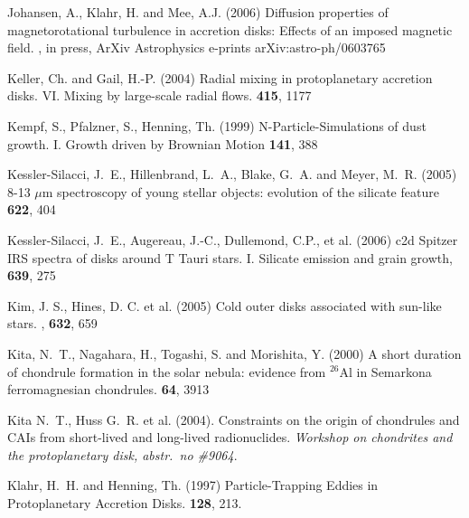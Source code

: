 \begin{literature}
\item Johansen, A., Klahr, H. and Mee, A.J. (2006) 
Diffusion properties of magnetorotational turbulence in accretion disks:
Effects of an imposed magnetic field. \mn, in press, 
ArXiv Astrophysics e-prints arXiv:astro-ph/0603765

\item
Keller, Ch. and Gail, H.-P. (2004) Radial mixing in protoplanetary accretion
disks. VI. Mixing by large-scale radial flows. \aap \textbf{415}, 1177

\item
Kempf, S., Pfalzner, S., Henning, Th. (1999) N-Particle-Simulations of dust
growth. I. Growth driven by Brownian Motion \ica \textbf{141}, 388

\item
Kessler-Silacci, J.~E., Hillenbrand, L.~A., Blake, G.~A. and Meyer, M.~R.
(2005) 8-13 $\mu$m spectroscopy of young stellar objects: evolution of
the silicate feature \apj \textbf{622}, 404

\item 
Kessler-Silacci, J.~E., Augereau, J.-C., Dullemond, C.P., et al. (2006) c2d
Spitzer IRS spectra of disks around T Tauri stars. I. Silicate emission and
grain growth, \apj \textbf{639}, 275

\item
Kim, J. S., Hines, D. C. et al. (2005) Cold outer disks associated with
sun-like stars. \apj, \textbf{632}, 659

\item
Kita, N.~T., Nagahara, H., Togashi, S. and Morishita, Y. (2000)
A short duration of chondrule formation in the solar nebula: evidence from 
$^{26}$Al in Semarkona ferromagnesian chondrules. \gca \textbf{64}, 3913


\item
Kita N.~T., Huss G.~R. et al. (2004). Constraints on the origin of
chondrules and CAIs from short-lived and long-lived
radionuclides.   \textit{Workshop on chondrites and the protoplanetary
disk, abstr.\ no \#9064}.

\item
Klahr, H.~H. and Henning, Th. (1997) Particle-Trapping Eddies in
Protoplanetary Accretion Disks. \ica \textbf{128}, 213.


\end{literature}
